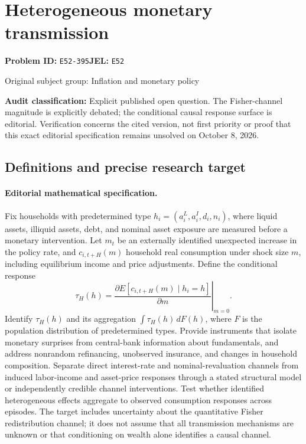 \documentclass[11pt,a4paper]{article}
\begin{document}
\section*{Heterogeneous monetary transmission}
\textbf{Problem ID:} \texttt{E52-395}\quad \textbf{JEL:} \texttt{E52}\par
\label{problem:OP-0244}
\label{audited:ECON-025}
{\sffamily\small\color{muted}Original subject group: Inflation and monetary policy\par}
\label{definitions:problem:30007525}
\textbf{Audit classification:} Explicit published open question. The Fisher-channel magnitude is explicitly debated; the conditional causal response surface is editorial. Verification concerns the cited version, not first priority or proof that this exact editorial specification remains unsolved on October 8, 2026.
\subsection*{Definitions and precise research target}
\paragraph{Editorial mathematical specification.} Fix households with predetermined type \(h_i=(a_i^{L},a_i^{I},d_i,n_i)\), where liquid assets, illiquid assets, debt, and nominal asset exposure are measured before a monetary intervention. Let \(m_t\) be an externally identified unexpected increase in the policy rate, and \(c_{i,t+H}(m)\) household real consumption under shock size \(m\), including equilibrium income and price adjustments. Define the conditional response
\[
\tau_H(h)=\left.\frac{\partial E[c_{i,t+H}(m)\mid h_i=h]}{\partial m}\right|_{m=0}.
\]
Identify \(\tau_H(h)\) and its aggregation \(\int\tau_H(h)\,dF(h)\), where \(F\) is the population distribution of predetermined types. Provide instruments that isolate monetary surprises from central-bank information about fundamentals, and address nonrandom refinancing, unobserved insurance, and changes in household composition. Separate direct interest-rate and nominal-revaluation channels from induced labor-income and asset-price responses through a stated structural model or independently credible channel interventions. Test whether identified heterogeneous effects aggregate to observed consumption responses across episodes. The target includes uncertainty about the quantitative Fisher redistribution channel; it does not assume that all transmission mechanisms are unknown or that conditioning on wealth alone identifies a causal channel.
\end{document}
